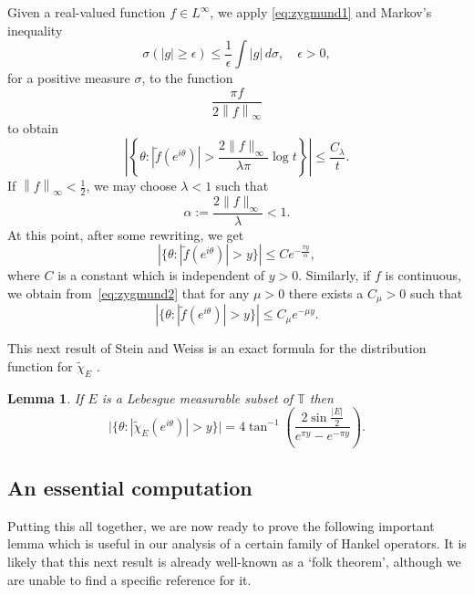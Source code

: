 \documentclass[11pt,reqno]{amsart}
\numberwithin{equation}{section}
\theoremstyle{plain}
\newtheorem{Lemma}[equation]{Lemma}
\theoremstyle{definition}
\begin{document}
	Given a real-valued function $f \in L^{\infty}$, we apply \eqref{eq:zygmund1}  and 
	Markov's inequality 
	$$\sigma(|g| \geq \epsilon) \leq \frac{1}{\epsilon} \int |g| \, d \sigma, \quad \epsilon > 0,$$
	for a positive measure $\sigma$, 
	to the function $$\frac{\pi f}{2 {\left\| {f} \right\|}_{\infty}}$$ to obtain
	\begin{equation*}
		\left|\left\{\theta: |\widetilde f(e^{i \theta})|> \frac{2\|f\|_\infty}{\lambda\pi} \log t\right\}\right|
		\leq \frac{C_\lambda}{t}.
	\end{equation*}
	If ${\left\| {f} \right\|}_\infty< \frac{1}{2}$, we may choose $\lambda<1$ such that $$\alpha:=\frac{2 \|f\|_\infty}{\lambda}<1.$$
	At this point, after some rewriting, we get
	\begin{equation}\label{eq:weak}
		\left|\{\theta: |\widetilde f(e^{i \theta})|>y\}\right|\leq C e^{-\frac{\pi y}{\alpha}},
	\end{equation}
	where $C$ is a constant which is independent of $y>0$. 
	Similarly, if $f$ is continuous, we obtain from~\eqref{eq:zygmund2} that for any $\mu>0$ there exists a $C_\mu > 0$ such that
	\begin{equation}\label{eq:weak2}
		\left|\{\theta: |\widetilde f(e^{i \theta})|>y\}\right|\leq C_\mu e^{-\mu y}.
	\end{equation}

	This next result of Stein and Weiss is an exact formula
	for the distribution function for $\widetilde \chi_E$ \cite{SW}. 
	
	\begin{Lemma}\label{le:stein-weiss}
		If $E$ is a Lebesgue measurable subset of ${\mathbb{T}}$ then
		\begin{equation*}
			\big|\{\theta: |\widetilde\chi_E(e^{i \theta})|>y\}\big|=4 \tan^{-1} \left(\frac{2\sin\frac{|E|}{2}}{e^{\pi y}-e^{-\pi y}}  \right).
		\end{equation*}
	\end{Lemma}

\subsection{An essential computation}

	Putting this all together, we are now ready to prove the following important lemma which is useful in our analysis of a certain family of Hankel operators.
	It is likely that this next result is already well-known as a `folk theorem', although we
	are unable to find a specific reference for it.
	
\end{document}
